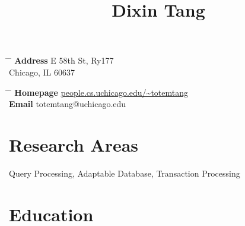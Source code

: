 \documentclass[10pt]{article} %
\begin{document}

\title{Dixin Tang} %


\parbox{0.5\textwidth}{ %
\begin{tabbing} %
\hspace{2.5cm} \= \hspace{4cm} \= \kill %
{\bf Address}  E 58th St, Ry177 \\ %
\> Chicago, IL 60637 \\ %
\end{tabbing}}
\hfill %
\parbox{0.5\textwidth}{ %
\begin{tabbing} %
\hspace{2.5cm} \= \hspace{4cm} \= \kill %
{\bf Homepage} \> \href{http://people.cs.uchicago.edu/~totemtang}{\url{people.cs.uchicago.edu/~totemtang}} \\ 
{\bf Email} \> totemtang@uchicago.edu \\ %
\end{tabbing}}
\vspace{-10mm}

\section{Research Areas}

Query Processing, Adaptable Database, Transaction Processing

\vspace{-5mm}

\section{Education}
\end{document}

